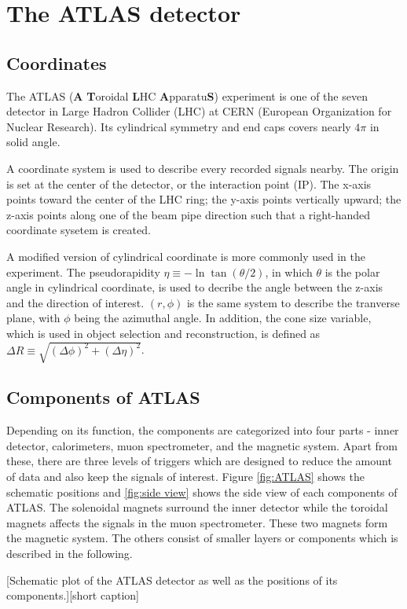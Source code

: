 \documentclass[class=NCU_thesis, crop=false]{standalone}
\begin{document}
\chapter{The ATLAS detector}
\section{Coordinates}
	The ATLAS (\textbf{A} \textbf{T}oroidal \textbf{L}HC \textbf{A}pparatu\textbf{S}) experiment is one of the seven detector in Large Hadron Collider (LHC) at CERN (European Organization for Nuclear Research). Its cylindrical symmetry and end caps covers nearly $4\pi$ in solid angle.
	
	A coordinate system is used to describe every recorded signals nearby. The origin is set at the center of the detector, or the interaction point (IP). The x-axis points toward the center of the LHC ring; the y-axis points vertically upward; the z-axis points along one of the beam pipe direction such that a right-handed coordinate sysetem is created.
	
	A modified version of cylindrical coordinate is more commonly used in the experiment. The pseudorapidity $\eta \equiv -\ln\tan(\theta / 2)$, in which $\theta$ is the polar angle in cylindrical coordinate, is used to decribe the angle between the z-axis and the direction of interest. $(r, \phi)$ is the same system to describe the tranverse plane, with $\phi$ being the azimuthal angle. In addition, the cone size variable, which is used in object selection and reconstruction, is defined as $\Delta R \equiv \sqrt{(\Delta \phi)^2 + (\Delta \eta)^2}$.

\section{Components of ATLAS}
	Depending on its function, the components are categorized into four parts - inner detector, calorimeters, muon spectrometer, and the magnetic system. Apart from these, there are three levels of triggers which are designed to reduce the amount of data and also keep the signals of interest. Figure \ref{fig:ATLAS} shows the schematic positions and \ref{fig:side view} shows the side view of each components of ATLAS. The solenoidal magnets surround the inner detector while the toroidal magnets affects the signals in the muon spectrometer. These two magnets form the magnetic system. The others consist of smaller layers or components which is described in the following.
	
	[Schematic plot of the ATLAS detector as well as the positions of its components.][short caption]
	
\end{document}
